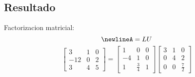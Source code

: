 \documentclass{article}%
\begin{document}
%
\subsection{Resultado}%
\label{subsec:Resultado}%
Factorizacion matricial:%
\[%
\newline%
 A     = L       U%
\]%
\[%
\left[\begin{matrix}3 & 1 & 0\\-12 & 0 & 2\\3 & 4 & 5\end{matrix}\right] = \left[\begin{matrix}1 & 0 & 0\\-4 & 1 & 0\\1 & \frac{3}{4} & 1\end{matrix}\right] \left[\begin{matrix}3 & 1 & 0\\0 & 4 & 2\\0 & 0 & \frac{7}{2}\end{matrix}\right]%
\]

%
\end{document}
